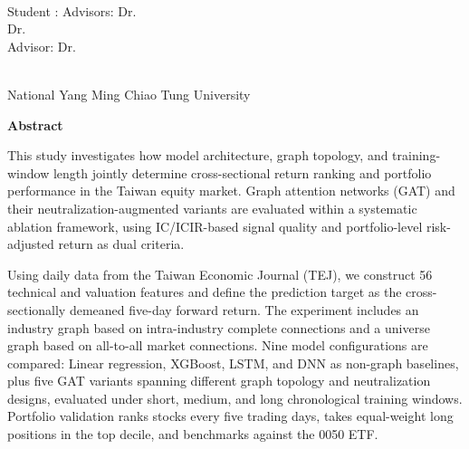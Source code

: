 \begin{center}
    \large
    
    \begin{singlespace}
        \textbf{\englishTitle{}} \\[0.5cm]
    \end{singlespace}
    
    \begin{singlespace}
        Student : \studentEnName{}  \hspace{1.0cm} 
        \ifdefined\advisorCnNameB
            Advisors: Dr.\, \advisorEnName \\
            \hspace{6.6cm} Dr.\, \advisorEnNameB  \\
        \else
            Advisor: Dr.\, \advisorEnName \\
        \fi
    \end{singlespace}
    
    \vspace{0.5cm}
    \begin{singlespace}
        \NameofDepartmentInstituteEN\\
        National Yang Ming Chiao Tung University\\[0.2cm]
    \end{singlespace}
    
    \textbf{Abstract} \\[0.5cm]

\end{center}

\normalsize

This study investigates how model architecture, graph topology, and training-window length jointly determine cross-sectional return ranking and portfolio performance in the Taiwan equity market. Graph attention networks (GAT) and their neutralization-augmented variants are evaluated within a systematic ablation framework, using IC/ICIR-based signal quality and portfolio-level risk-adjusted return as dual criteria.

Using daily data from the Taiwan Economic Journal (TEJ), we construct 56 technical and valuation features and define the prediction target as the cross-sectionally demeaned five-day forward return. The experiment includes an industry graph based on intra-industry complete connections and a universe graph based on all-to-all market connections. Nine model configurations are compared: Linear regression, XGBoost, LSTM, and DNN as non-graph baselines, plus five GAT variants spanning different graph topology and neutralization designs, evaluated under short, medium, and long chronological training windows. Portfolio validation ranks stocks every five trading days, takes equal-weight long positions in the top decile, and benchmarks against the 0050 ETF.

